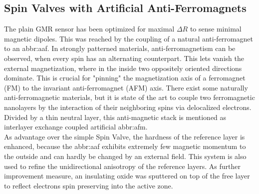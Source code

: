 \subsection{Spin Valves with Artificial Anti-Ferromagnets}
The plain GMR sensor has been optimized for maximal $\Delta R$ to sense minimal magnetic dipoles. This was reached by the coupling of a natural anti-ferromagnet to an \acrfull{abbr:aaf}. In strongly patterned materials, anti-ferromagnetism can be observed, when every spin has an alternating counterpart. 
\newpage
This lets vanish the external magnetization, where in the inside two oppositely oriented directions dominate. This is crucial for "pinning" the magnetization axis of a ferromagnet (FM) to the invariant anti-ferromagnet (AFM) axis.\cite{lit:nano:physicsmagneticmaterials} There exist some naturally anti-ferromagnetic materials, but it is state of the art to couple two ferromagnetic nanolayers by the interaction of their neighboring spins via delocalized electrons. Divided by a thin neutral layer, this anti-magnetic stack is mentioned as interlayer exchange coupled artificial \acrshort{abbr:afm}.\cite{lit:nano:spinelectronics}\\ As advantage over the simple Spin Valve, the hardness of the reference layer is enhanced, because the \acrshort{abbr:aaf} exhibits extremely few magnetic momentum to the outside and can hardly be changed by an external field. This system is also used to refine the unidirectional anisotropy of the reference layers.\cite{patent:wheatstone_GMR} As further improvement measure, an insulating oxide was sputtered on top of the free layer to reflect electrons spin preserving into the active zone. 
\newpage

